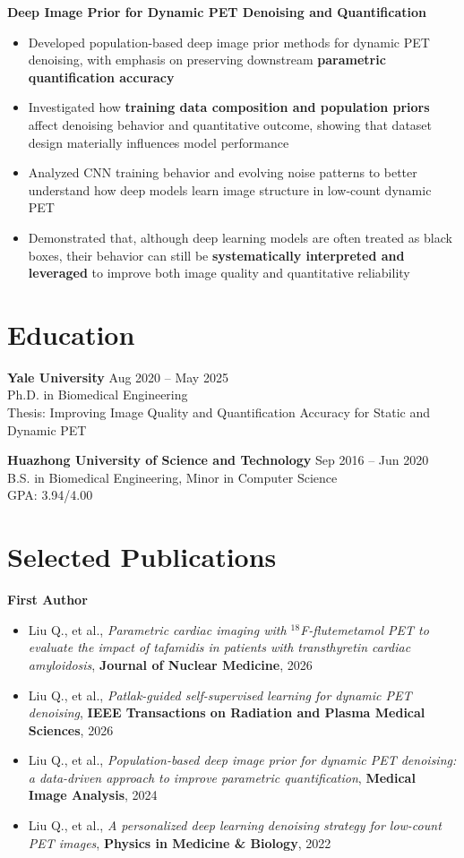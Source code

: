 \textbf{Deep Image Prior for Dynamic PET Denoising and Quantification}
\begin{itemize}[leftmargin=*]
\item Developed population-based deep image prior methods for dynamic PET denoising, with emphasis on preserving downstream \textbf{parametric quantification accuracy}
\item Investigated how \textbf{training data composition and population priors} affect denoising behavior and quantitative outcome, showing that dataset design materially influences model performance
\item Analyzed CNN training behavior and evolving noise patterns to better understand how deep models learn image structure in low-count dynamic PET
\item Demonstrated that, although deep learning models are often treated as black boxes, their behavior can still be \textbf{systematically interpreted and leveraged} to improve both image quality and quantitative reliability
\end{itemize}

\section{Education}
\textbf{Yale University} \hfill Aug 2020 -- May 2025 \\
Ph.D. in Biomedical Engineering \\
Thesis: Improving Image Quality and Quantification Accuracy for Static and Dynamic PET

\textbf{Huazhong University of Science and Technology} \hfill Sep 2016 -- Jun 2020 \\
B.S. in Biomedical Engineering, Minor in Computer Science \\
GPA: 3.94/4.00

\section{Selected Publications}
\textbf{First Author}
\begin{itemize}[leftmargin=*]
\item Liu Q., et al., \textit{Parametric cardiac imaging with $^{18}$F-flutemetamol PET to evaluate the impact of tafamidis in patients with transthyretin cardiac amyloidosis}, \textbf{Journal of Nuclear Medicine}, 2026
\item Liu Q., et al., \textit{Patlak-guided self-supervised learning for dynamic PET denoising}, \textbf{IEEE Transactions on Radiation and Plasma Medical Sciences}, 2026
\item Liu Q., et al., \textit{Population-based deep image prior for dynamic PET denoising: a data-driven approach to improve parametric quantification}, \textbf{Medical Image Analysis}, 2024
\item Liu Q., et al., \textit{A personalized deep learning denoising strategy for low-count PET images}, \textbf{Physics in Medicine \& Biology}, 2022
\end{itemize}

